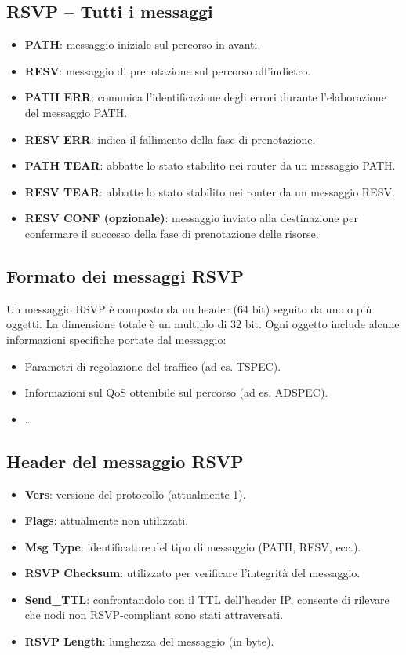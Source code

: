 \subsection{RSVP – Tutti i messaggi}
\begin{itemize}
	\item \textbf{PATH}: messaggio iniziale sul percorso in avanti.
	\item \textbf{RESV}: messaggio di prenotazione sul percorso all'indietro.
	\item \textbf{PATH ERR}: comunica l'identificazione degli errori durante l'elaborazione del messaggio PATH.
	\item \textbf{RESV ERR}: indica il fallimento della fase di prenotazione.
	\item \textbf{PATH TEAR}: abbatte lo stato stabilito nei router da un messaggio PATH.
	\item \textbf{RESV TEAR}: abbatte lo stato stabilito nei router da un messaggio RESV.
	\item \textbf{RESV CONF (opzionale)}: messaggio inviato alla destinazione per confermare il successo della fase di prenotazione delle risorse.
\end{itemize}

\subsection{Formato dei messaggi RSVP}
Un messaggio RSVP è composto da un header (64 bit) seguito da uno o più oggetti. La dimensione totale è un multiplo di 32 bit. Ogni oggetto include alcune informazioni specifiche portate dal messaggio:
\begin{itemize}
	\item Parametri di regolazione del traffico (ad es. TSPEC).
	\item Informazioni sul QoS ottenibile sul percorso (ad es. ADSPEC).
	\item \ldots
\end{itemize}

\subsection{Header del messaggio RSVP}
\begin{itemize}
	\item \textbf{Vers}: versione del protocollo (attualmente 1).
	\item \textbf{Flags}: attualmente non utilizzati.
	\item \textbf{Msg Type}: identificatore del tipo di messaggio (PATH, RESV, ecc.).
	\item \textbf{RSVP Checksum}: utilizzato per verificare l'integrità del messaggio.
	\item \textbf{Send\_TTL}: confrontandolo con il TTL dell'header IP, consente di rilevare che nodi non RSVP-compliant sono stati attraversati.
	\item \textbf{RSVP Length}: lunghezza del messaggio (in byte).
\end{itemize}

